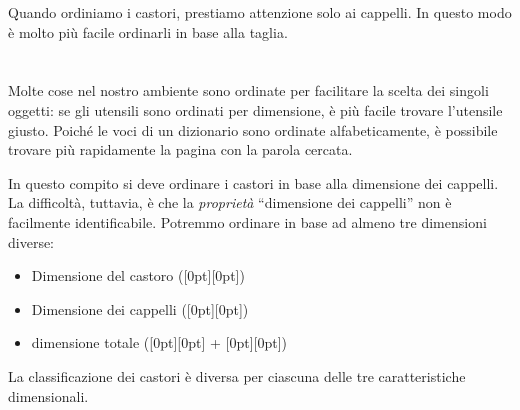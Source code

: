 {{Quando ordiniamo i castori, prestiamo attenzione solo ai cappelli. In questo modo è molto più facile ordinarli in base alla taglia.

{\centering%
\raisebox{-0.5ex}{} \raisebox{-0.5ex}{}\par}



\section*{\BrochureItsInformatics}
Molte cose nel nostro ambiente sono ordinate per facilitare la scelta dei singoli oggetti: se gli utensili sono ordinati per dimensione, è più facile trovare l’utensile giusto. Poiché le voci di un dizionario sono ordinate alfabeticamente, è possibile trovare più rapidamente la pagina con la parola cercata.

In questo compito si deve ordinare i castori in base alla dimensione dei cappelli. La difficoltà, tuttavia, è che la \emph{proprietà} \enquote{dimensione dei cappelli} non è facilmente identificabile. Potremmo ordinare in base ad almeno tre dimensioni diverse:

\begin{itemize}
  \item Dimensione del castoro (\raisebox{-0.5ex}[0pt][0pt]{})
  \item Dimensione dei cappelli (\raisebox{-0.5ex}[0pt][0pt]{})
  \item dimensione totale (\raisebox{-0.5ex}[0pt][0pt]{} + \raisebox{-0.5ex}[0pt][0pt]{})
\end{itemize}

{\centering%
\par}

La classificazione dei castori è diversa per ciascuna delle tre caratteristiche dimensionali.

}}
